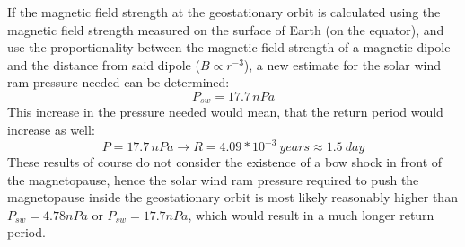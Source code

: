 \documentclass[12pt]{article}
\begin{document}
        If the magnetic field strength at the geostationary orbit is calculated using the magnetic field strength measured on the surface of Earth (on the equator), and use the proportionality between the magnetic field strength of a magnetic dipole and the distance from said dipole ($B\propto r^{-3}$), a new estimate for the solar wind ram pressure needed can be determined:
        \begin{equation}
            P_{sw}=17.7\, nPa
        \end{equation}
        This increase in the pressure needed would mean, that the return period would increase as well:
        \begin{equation}
            P=17.7\, nPa\rightarrow R=4.09*10^{-3}\ years\approx1.5\ day
        \end{equation}
        These results of course do not consider the existence of a bow shock in front of the magnetopause, hence the solar wind ram pressure required to push the magnetopause inside the geostationary orbit is most likely reasonably higher than $P_{sw}=4.78nPa$ or $P_{sw}=17.7nPa$, which would result in a much longer return period.
\end{document}
